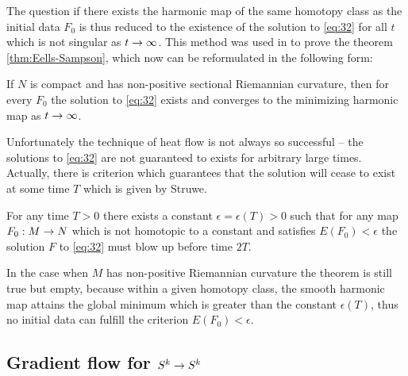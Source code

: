 The question if there exists the harmonic map of the same homotopy
class as the initial data $F_0$ is thus reduced to the existence of
the solution to \eqref{eq:32} for all $t$ which is not singular as
$t\rightarrow\infty$. This method was used in \cite{Eells1964} to prove the
theorem \ref{thm:Eells-Sampson}, which now can be reformulated in the
following form:

\begin{theorem}\label{thm:Eells-Sampson2}
  If $N$ is compact and has non-positive sectional Riemannian
  curvature, then for every $F_0$ the solution to \eqref{eq:32} exists
  and converges to the minimizing harmonic map as $t\rightarrow\infty$.
\end{theorem}

Unfortunately the technique of heat flow is not always so successful
-- the solutions to \eqref{eq:32} are not guaranteed to exists for
arbitrary large times. Actually, there is criterion which guarantees
that the solution will cease to exist at some time $T$ which is given
by Struwe.

\begin{theorem}\label{thm:Struwe}
  For any time $T>0$ there exists a constant $\epsilon=\epsilon(T)>0$
  such that for any map $F_0:M\rightarrow N$ which is not homotopic to a
  constant and satisfies $E(F_0)<\epsilon$ the solution $F$ to
  \eqref{eq:32} must blow up before time $2T$.
\end{theorem}

In the case when $M$ has non-positive Riemannian curvature the theorem
is still true but empty, because within a given homotopy class, the
smooth harmonic map attains the global minimum which is greater than
the constant $\epsilon(T)$, thus no initial data can fulfill the
criterion $E(F_0)<\epsilon$.

\subsection{Gradient flow for $S^k\rightarrow S^k$}
\label{sec:gradient-flow-skra}

